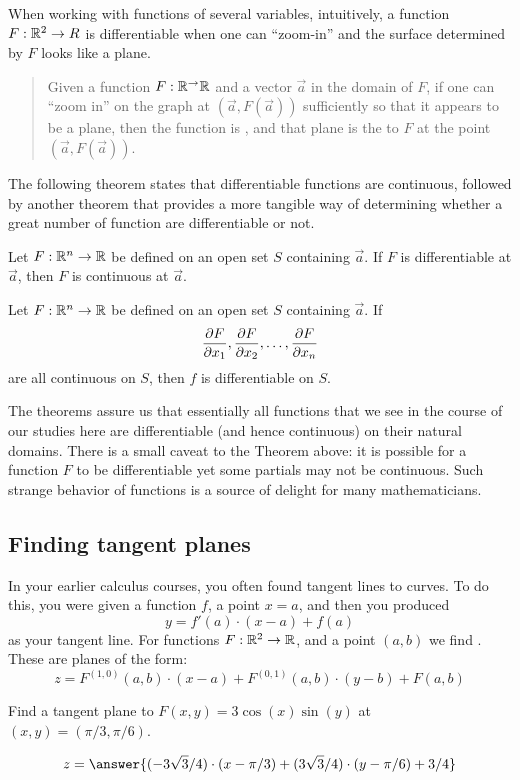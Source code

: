 \documentclass{ximera}
\begin{document}
When working with functions of several variables, intuitively, a
function $F:\R^2\to R$ is differentiable when one can ``zoom-in'' and
the surface determined by $F$ looks like a plane. %
\begin{quote}%
  Given a function $F:\R^\to\R$ and a vector $\vec{a}$ in the domain
  of $F$, if one can ``zoom in'' on the graph at $(\vec{a}, F(\vec{a}))$
  sufficiently so that it appears to be a plane, then the
  function is , and that plane is the 
  to $F$ at the point $(\vec{a},F(\vec{a}))$.
\end{quote}
The following theorem states that differentiable functions are
continuous, followed by another theorem that provides a more tangible
way of determining whether a great number of function are
differentiable or not.

\begin{theorem}
Let $F:\R^n\to\R$ be defined on an open set $S$ containing
$\vec{a}$.  If $F$ is differentiable at $\vec{a}$, then $F$ is
continuous at $\vec{a}$.
\end{theorem}

\begin{theorem}
  Let $F:\R^n\to\R$ be defined on an open set $S$ containing
  $\vec{a}$.  If
  \[
  \pp[F]{x_1},\pp[F]{x_2},\dots,\pp[F]{x_n}
  \]
  are all continuous on $S$, then $f$ is differentiable on $S$.
\end{theorem}

The theorems assure us that essentially all functions that we see in
the course of our studies here are differentiable (and hence
continuous) on their natural domains. There is a small caveat to the
Theorem above: it is possible for a function $F$ to be differentiable
yet some partials may not be continuous. Such strange behavior of
functions is a source of delight for many mathematicians.

\subsection{Finding tangent planes}

In your earlier calculus courses, you often found tangent lines to
curves. To do this, you were given a function $f$, a point $x=a$, and
then you produced
\[
y = f'(a)\cdot (x-a) + f(a)
\]
as your tangent line. For functions $F:\R^2\to\R$, and a point $(a,b)$
we find . These are planes of the form:
\[
z= F^{(1,0)}(a,b)\cdot(x-a) + F^{(0,1)}(a,b)\cdot(y-b)+F(a,b) 
\]
\begin{question}
  Find a tangent plane to $F(x,y) = 3\cos(x)\sin(y)$ at $(x,y) =
  (\pi/3,\pi/6)$.
  \begin{prompt}
    \[
    z = \answer{(-3\sqrt{3}/4)\cdot (x-\pi/3) + (3\sqrt{3}/4)\cdot (y-\pi/6) + 3/4}
    \]
  \end{prompt}
\end{question}
\end{document}
